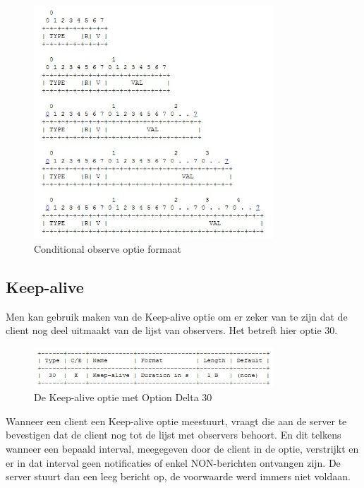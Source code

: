 \begin{figure}[h!]
\centering
\includegraphics[width=0.8\textwidth]{fig/conditional_format}
\caption{Conditional observe optie formaat}
\end{figure}

\subsection{Keep-alive}

Men kan gebruik maken van de Keep-alive optie om er zeker van te zijn dat de client nog deel uitmaakt van de lijst van observers. Het betreft hier optie 30.\\

\begin{figure}[h!]
\centering
\includegraphics[width=0.8\textwidth]{fig/keep_alive}
\caption{De Keep-alive optie met Option Delta 30}
\end{figure}

Wanneer een client een Keep-alive optie meestuurt, vraagt die aan de server te bevestigen dat de client nog tot de lijst met observers behoort. En dit telkens wanneer een bepaald interval,
meegegeven door de client in de optie, verstrijkt en er in dat interval geen notificaties of enkel NON-berichten ontvangen zijn. De server stuurt dan een leeg bericht op, de
voorwaarde werd immers niet voldaan.

